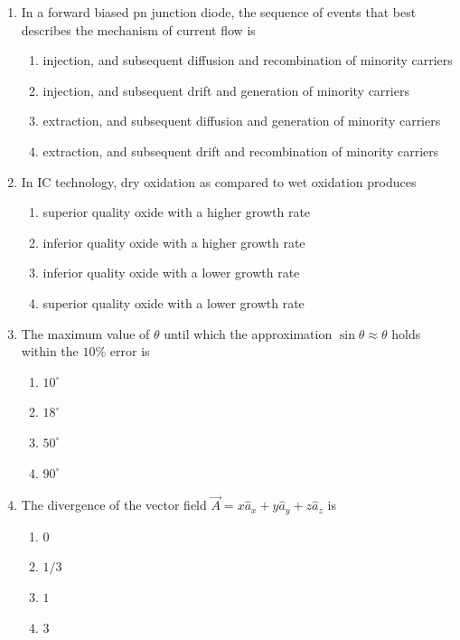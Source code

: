 \documentclass[journal,12pt,onecolumn]{IEEEtran}
\theoremstyle{remark}
\begin{document}
\begin{enumerate}
\item In a forward biased pn junction diode, the sequence of events that best describes the mechanism of current flow is
\begin{enumerate}
    \item injection, and subsequent diffusion and recombination of minority carriers
    \item injection, and subsequent drift and generation of minority carriers
    \item extraction, and subsequent diffusion and generation of minority carriers
    \item extraction, and subsequent drift and recombination of minority carriers
\end{enumerate}
\hfill {}

\item In IC technology, dry oxidation  as compared to wet oxidation  produces
\begin{enumerate}
    \item superior quality oxide with a higher growth rate
    \item inferior quality oxide with a higher growth rate
    \item inferior quality oxide with a lower growth rate
    \item superior quality oxide with a lower growth rate
\end{enumerate}
\hfill {}

\item The maximum value of $\theta$ until which the approximation $\sin{\theta} \approx \theta$ holds within the $10\%$ error is 
\begin{multicols}{4}
\begin{enumerate}
    \item $10^{\circ}$
    \item $18^{\circ}$
    \item $50^{\circ}$
    \item $90^{\circ}$
\end{enumerate}
\end{multicols}
\hfill {}

\item The divergence of the vector field $\vec{A}=x\hat{a}_{x}+y\hat{a}_{y}+z\hat{a}_{z}$ is
\begin{multicols}{4}
 \begin{enumerate}
        \item $0$
        \item $1/3$
        \item $1$
        \item $3$
  \end{enumerate}
\end{multicols}
\hfill {}


\end{enumerate}
\end{document}
